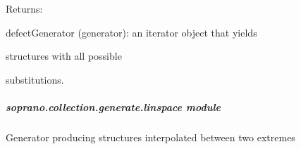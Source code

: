 \documentclass[letterpaper,10pt,english]{sphinxmanual}
\begin{document}
\begin{fulllineitems}
\begin{DUlineblock}{0em}
\begin{DUlineblock}{\DUlineblockindent}
\begin{DUlineblock}{\DUlineblockindent}
\end{DUlineblock}
\end{DUlineblock}
\item[] Returns:
\item[]
\begin{DUlineblock}{\DUlineblockindent}
\item[] defectGenerator (generator): an iterator object that yields
\item[]
\begin{DUlineblock}{\DUlineblockindent}
\item[] structures with all possible
\item[] substitutions.
\end{DUlineblock}
\end{DUlineblock}
\end{DUlineblock}

\end{fulllineitems}



\subparagraph{soprano.collection.generate.linspace module}
\label{doctree/soprano.collection.generate.linspace::doc}\label{doctree/soprano.collection.generate.linspace:soprano-collection-generate-linspace-module}\label{doctree/soprano.collection.generate.linspace:module-soprano.collection.generate.linspace}
Generator producing structures interpolated between two extremes
\end{document}
